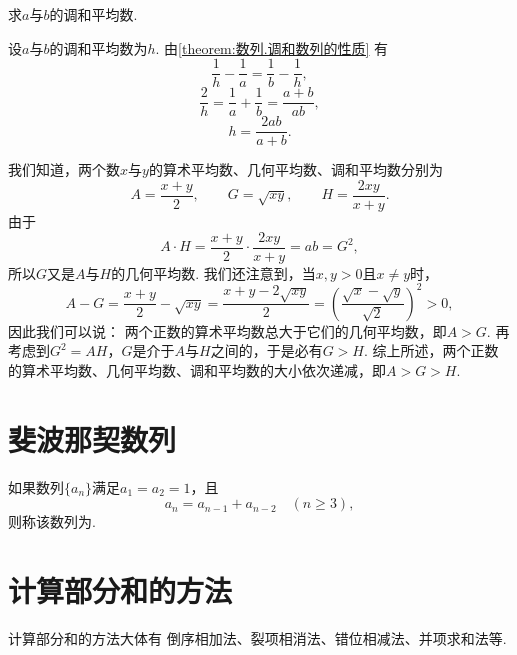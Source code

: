 \begin{example}
求\(a\)与\(b\)的调和平均数.
\begin{solution}
设\(a\)与\(b\)的调和平均数为\(h\).
由\cref{theorem:数列.调和数列的性质} 有\begin{equation*}
    \frac{1}{h} - \frac{1}{a}
    = \frac{1}{b} - \frac{1}{h},
\end{equation*}\begin{equation*}
    \frac{2}{h} = \frac{1}{a} + \frac{1}{b}
    = \frac{a+b}{ab},
\end{equation*}\begin{equation*}
    h = \frac{2ab}{a+b}.
\end{equation*}
\end{solution}
\end{example}

我们知道，两个数\(x\)与\(y\)的算术平均数、几何平均数、调和平均数分别为\begin{equation*}
    A = \frac{x+y}{2}, \qquad
    G = \sqrt{xy}, \qquad
    H = \frac{2xy}{x+y}.
\end{equation*}
由于\begin{equation*}
    A \cdot H = \frac{x+y}{2} \cdot \frac{2xy}{x+y}
    = ab = G^2,
\end{equation*}
所以\(G\)又是\(A\)与\(H\)的几何平均数.
我们还注意到，当\(x,y>0\)且\(x \neq y\)时，\begin{equation*}
    A - G = \frac{x+y}{2} - \sqrt{xy}
    = \frac{x+y-2\sqrt{xy}}{2}
    = \left(\frac{\sqrt{x}-\sqrt{y}}{\sqrt{2}}\right)^2
    > 0,
\end{equation*}
因此我们可以说：
两个正数的算术平均数总大于它们的几何平均数，即\(A > G\).
再考虑到\(G^2 = A H\)，\(G\)是介于\(A\)与\(H\)之间的，于是必有\(G > H\).
综上所述，两个正数的算术平均数、几何平均数、调和平均数的大小依次递减，即\(A > G > H\).

\section{斐波那契数列}
如果数列\(\{a_n\}\)满足\(a_1=a_2=1\)，且\begin{equation*}
a_n = a_{n-1} + a_{n-2} \quad(n\geq3),
\end{equation*}则称该数列为.

\section{计算部分和的方法}
计算部分和的方法大体有
倒序相加法、裂项相消法、错位相减法、并项求和法等.


